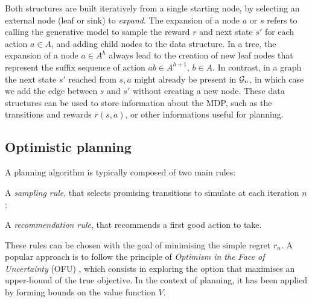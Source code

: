 \documentclass[runningheads]{llncs}
\begin{document}
Both structures are built iteratively from a single starting node, by selecting an external node (leaf or sink) to \emph{expand}. The expansion of a node $a$ or $s$ refers to calling the generative model to sample the reward $r$ and next state $s'$ for each action $a\in A$, and adding child nodes to the data structure. In a tree, the expansion of a node $a\in A^h$ always lead to the creation of new leaf nodes that represent the suffix sequence of action $ab\in A^{h+1},\, b\in A$. In contrast, in a graph the next state $s'$ reached from $s,a$ might already be present in $\mathcal{G}_n$, in which case we add the edge between $s$ and $s'$ without creating a new node.
These data structures can be used to store information about the MDP, such as the transitions and rewards $r(s, a)$, or other informations useful for planning.


\subsection{Optimistic planning}

A planning algorithm is typically composed of two main rules:
\begin{enumerate*}[label=(\roman*)]
	\item A \emph{sampling rule}, that selects promising transitions to simulate at each iteration $n$;
	\item A \emph{recommendation rule}, that recommends a first good action to take.
\end{enumerate*}
These rules can be chosen with the goal of minimising the simple regret $r_n$.
A popular approach is to follow the principle of \emph{Optimism in the Face of Uncertainty} (OFU) \citep[see][]{Munos14}, which consists in exploring the option that maximises an upper-bound of the true objective. In the context of planning, it has been applied by forming bounds on the value function $V$.
\end{document}
